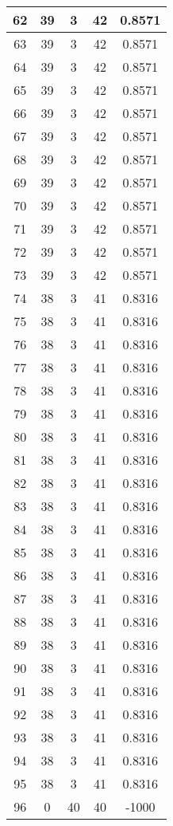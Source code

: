 \documentclass[letterpaper, 12pt]{article}
\begin{document}
\begin{longtable}{|c|c|c|c|c|}
\hline
62 & 39 & 3 & 42 & 0.8571 \\
\hline
63 & 39 & 3 & 42 & 0.8571 \\
\hline
64 & 39 & 3 & 42 & 0.8571 \\
\hline
65 & 39 & 3 & 42 & 0.8571 \\
\hline
66 & 39 & 3 & 42 & 0.8571 \\
\hline
67 & 39 & 3 & 42 & 0.8571 \\
\hline
68 & 39 & 3 & 42 & 0.8571 \\
\hline
69 & 39 & 3 & 42 & 0.8571 \\
\hline
70 & 39 & 3 & 42 & 0.8571 \\
\hline
71 & 39 & 3 & 42 & 0.8571 \\
\hline
72 & 39 & 3 & 42 & 0.8571 \\
\hline
73 & 39 & 3 & 42 & 0.8571 \\
\hline
74 & 38 & 3 & 41 & 0.8316 \\
\hline
75 & 38 & 3 & 41 & 0.8316 \\
\hline
76 & 38 & 3 & 41 & 0.8316 \\
\hline
77 & 38 & 3 & 41 & 0.8316 \\
\hline
78 & 38 & 3 & 41 & 0.8316 \\
\hline
79 & 38 & 3 & 41 & 0.8316 \\
\hline
80 & 38 & 3 & 41 & 0.8316 \\
\hline
81 & 38 & 3 & 41 & 0.8316 \\
\hline
82 & 38 & 3 & 41 & 0.8316 \\
\hline
83 & 38 & 3 & 41 & 0.8316 \\
\hline
84 & 38 & 3 & 41 & 0.8316 \\
\hline
85 & 38 & 3 & 41 & 0.8316 \\
\hline
86 & 38 & 3 & 41 & 0.8316 \\
\hline
87 & 38 & 3 & 41 & 0.8316 \\
\hline
88 & 38 & 3 & 41 & 0.8316 \\
\hline
89 & 38 & 3 & 41 & 0.8316 \\
\hline
90 & 38 & 3 & 41 & 0.8316 \\
\hline
91 & 38 & 3 & 41 & 0.8316 \\
\hline
92 & 38 & 3 & 41 & 0.8316 \\
\hline
93 & 38 & 3 & 41 & 0.8316 \\
\hline
94 & 38 & 3 & 41 & 0.8316 \\
\hline
95 & 38 & 3 & 41 & 0.8316 \\
\hline
96 & 0 & 40 & 40 & -1000 \\

\end{longtable}
\end{document}
